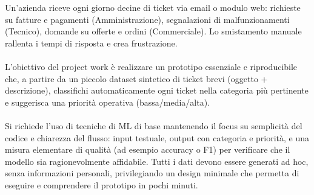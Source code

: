 Un’azienda riceve ogni giorno decine di ticket via email o modulo web: richieste su fatture e pagamenti (Amministrazione), segnalazioni di malfunzionamenti (Tecnico), domande su offerte e ordini (Commerciale). Lo smistamento manuale rallenta i tempi di risposta e crea frustrazione.
\\\\L’obiettivo del project work è realizzare un prototipo essenziale e riproducibile che, a partire da un piccolo dataset sintetico di ticket brevi (oggetto + descrizione), classifichi automaticamente ogni ticket nella categoria più pertinente e suggerisca una priorità operativa (bassa/media/alta).
\\\\Si richiede l’uso di tecniche di ML di base mantenendo il focus su semplicità del codice e chiarezza del flusso: input testuale, output con categoria e priorità, e una misura elementare di qualità (ad esempio accuracy o F1) per verificare che il modello sia ragionevolmente affidabile. Tutti i dati devono essere generati ad hoc, senza informazioni personali, privilegiando un design minimale che permetta di eseguire e comprendere il prototipo in pochi minuti.